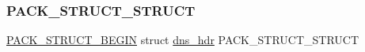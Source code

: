\subsubsection{\texorpdfstring{P\+A\+C\+K\+\_\+\+S\+T\+R\+U\+C\+T\+\_\+\+S\+T\+R\+U\+CT}{PACK\_STRUCT\_STRUCT}}
{\footnotesize\ttfamily \hyperlink{group__compiler__abstraction_ga73199061891adf1b912d20835c7d5e96}{P\+A\+C\+K\+\_\+\+S\+T\+R\+U\+C\+T\+\_\+\+B\+E\+G\+IN} struct \hyperlink{structdns__hdr}{dns\+\_\+hdr}  P\+A\+C\+K\+\_\+\+S\+T\+R\+U\+C\+T\+\_\+\+S\+T\+R\+U\+CT}

